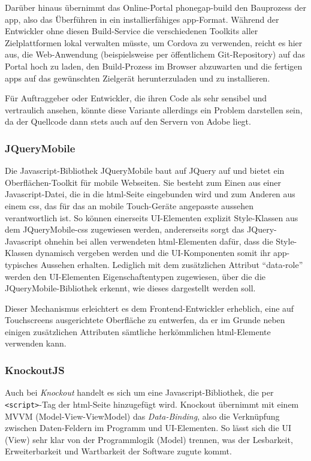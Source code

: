 Darüber hinaus übernimmt das Online-Portal \gls{phonegap-build} den Bauprozess der \gls{app}, also das Überführen in ein installierfähiges \gls{app}-Format. 
Während der Entwickler ohne diesen Build-Service die verschiedenen Toolkits aller Zielplattformen lokal verwalten müsste, um Cordova zu verwenden,\cite{phonegap-doc-cordova} reicht es hier aus, die Web-Anwendung (beispielsweise per öffentlichem Git-Repository) auf das Portal hoch zu laden, den Build-Prozess im Browser abzuwarten und die fertigen \glspl{app} auf das gewünschten Zielgerät herunterzuladen und zu installieren. 

Für Auftraggeber oder Entwickler, die ihren Code als sehr sensibel und vertraulich ansehen, könnte diese Variante allerdings ein Problem darstellen sein, da der Quellcode dann stets auch auf den Servern von Adobe liegt.

\subsubsection{JQueryMobile}
Die Javascript-Bibliothek JQueryMobile baut auf JQuery auf und bietet ein Oberflächen-Toolkit für mobile Webseiten. Sie besteht zum Einen aus einer Javascript-Datei, die in die \gls{html}-Seite eingebunden wird und zum Anderen aus einem \gls{css}, das für das an mobile Touch-Geräte angepasste aussehen verantwortlich ist. 
So können einerseits UI-Elementen explizit Style-Klassen aus dem JQueryMobile-\gls{css} zugewiesen werden, andererseits sorgt das JQuery-Javascript ohnehin bei allen verwendeten \gls{html}-Elementen dafür, dass die Style-Klassen dynamisch vergeben werden und die UI-Komponenten somit ihr \gls{app}-typisches Aussehen erhalten.
Lediglich mit dem zusätzlichen Attribut \enquote{data-role} werden den UI-Elementen Eigenschaftentypen zugewiesen, über die die JQueryMobile-Bibliothek erkennt, wie dieses dargestellt werden soll.

Dieser Mechanismus erleichtert es dem Frontend-Entwickler erheblich, eine auf Touchscreens ausgerichtete Oberfläche zu entwerfen, da er im Grunde neben einigen zusätzlichen Attributen sämtliche herkömmlichen \gls{html}-Elemente verwenden kann. 

\subsubsection{KnockoutJS}
Auch bei \emph{Knockout} handelt es sich um eine Javascript-Bibliothek, die per \mbox{\texttt{<script>}-Tag} der \gls{html}-Seite hinzugefügt wird. Knockout übernimmt mit einem MVVM (Model-View-ViewModel) das \emph{Data-Binding}, also die Verknüpfung zwischen Daten-Feldern im Programm und UI-Elementen.
So lässt sich die UI (View) sehr klar von der Programmlogik (Model) trennen, was der Lesbarkeit, Erweiterbarkeit und Wartbarkeit der Software zugute kommt.

